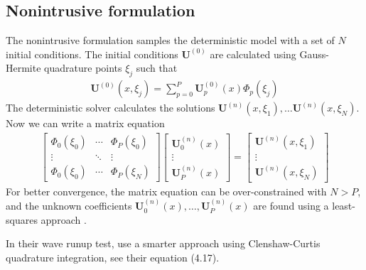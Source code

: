 \documentclass{article}
\newcommand{\vect}{\mathbf}
\begin{document}
\subsection*{Nonintrusive formulation}

The nonintrusive formulation samples the deterministic model with a set of $N$ initial conditions.
The initial conditions $\vect{U}^{(0)}$ are calculated using Gauss-Hermite quadrature points $\xi_j$ such that
\begin{align}
	\vect{U}^{(0)}(x, \xi_j) = \sum_{p=0}^P \vect{U}_p^{(0)}(x) \Phi_p(\xi_j)
\end{align}
The deterministic solver calculates the solutions $\vect{U}^{(n)}(x, \xi_1), \ldots \vect{U}^{(n)}(x, \xi_N)$.
Now we can write a matrix equation
\begin{align}
	\begin{bmatrix}
		\Phi_0(\xi_0) & \cdots & \Phi_P(\xi_0) \\
		\vdots & \ddots & \vdots \\
		\Phi_0(\xi_0) & \cdots & \Phi_P(\xi_N)
	\end{bmatrix}
	\begin{bmatrix}
		\vect{U}_0^{(n)}(x) \\
		\vdots \\
		\vect{U}_P^{(n)}(x)
	\end{bmatrix}
	=
	\begin{bmatrix}
		\vect{U}^{(n)}(x, \xi_1) \\
		\vdots \\
		\vect{U}^{(n)}(x, \xi_N)
	\end{bmatrix}
\end{align}
For better convergence, the matrix equation can be over-constrained with $N > P$, and the unknown coefficients $\vect{U}_0^{(n)}(x), \ldots, \vect{U}_P^{(n)}(x)$ are found using a least-squares approach \citep{hosder2007}.

In their wave runup test, \citet{ge2009} use a smarter approach using Clenshaw-Curtis quadrature integration, see their equation (4.17).



\end{document}
